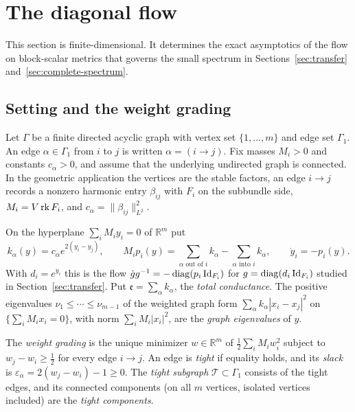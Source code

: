 \section{The diagonal flow}\label{sec:diagonal-flow}

This section is finite-dimensional. It determines the exact asymptotics
of the flow on block-scalar metrics that governs the small spectrum in
Sections~\ref{sec:transfer} and~\ref{sec:complete-spectrum}.

\subsection{Setting and the weight grading}

Let $\Gamma$ be a finite directed acyclic graph with vertex set
$\{1,\ldots,m\}$ and edge set $\Gamma_1$. An edge $\alpha\in\Gamma_1$ from $i$ to
$j$ is written $\alpha=(i\to j)$. Fix masses $M_i>0$ and constants
$c_\alpha>0$, and assume that the underlying undirected graph is connected.
In the geometric application the vertices are the stable factors, an edge
$i\to j$ records a nonzero harmonic entry $\beta_{ij}$ with $F_i$ on the
subbundle side, $M_i=V\operatorname{rk} F_i$, and $c_\alpha=\lVert\beta_{ij}\rVert_{L^2}^2$.

On the hyperplane $\sum_iM_iy_i=0$ of $\mathbb R^m$ put
\begin{equation}\label{eq:diag-flow}
 k_\alpha(y)=c_\alpha e^{2(y_i-y_j)},\qquad
 M_ip_i(y)=\sum_{\alpha\text{ out of }i}k_\alpha
          -\sum_{\alpha\text{ into }i}k_\alpha,\qquad
 \dot y_i=-p_i(y).
\end{equation}
With $d_i=e^{y_i}$ this is the flow $\dot gg^{-1}=-\operatorname{diag}(p_i\operatorname{Id}_{F_i})$
for $g=\operatorname{diag}(d_i\operatorname{Id}_{F_i})$ studied in Section~\ref{sec:transfer}. Put
$\mathfrak e=\sum_\alpha k_\alpha$, the \emph{total conductance}. The positive eigenvalues
$\nu_1\le\cdots\le\nu_{m-1}$ of the weighted graph form
$\sum_\alpha k_\alpha|x_i-x_j|^2$ on $\{\sum_iM_ix_i=0\}$, with norm
$\sum_iM_i|x_i|^2$, are the \emph{graph eigenvalues} of $y$.

\begin{definition}\label{def:weight-grading}
The \emph{weight grading} is the unique minimizer $w\in\mathbb R^m$ of
$\frac12\sum_iM_iw_i^2$ subject to $w_j-w_i\ge\frac12$ for every edge
$i\to j$. An edge is \emph{tight} if equality holds, and its \emph{slack}
is $\varepsilon_\alpha=2(w_j-w_i)-1\ge0$. The \emph{tight subgraph}
$\mathcal T\subset\Gamma_1$ consists of the tight edges, and its connected components
(on all $m$ vertices, isolated vertices included) are the \emph{tight
components}.
\end{definition}

